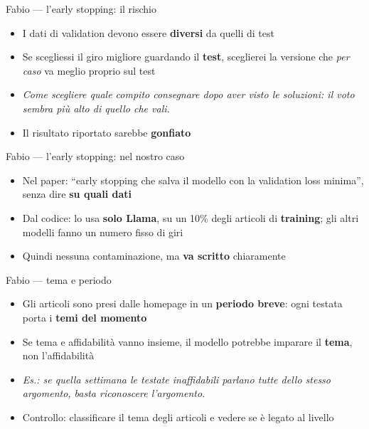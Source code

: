 \documentclass[aspectratio=169]{beamer}
\newcommand{\hl}[1]{\textbf{#1}}
\begin{document}
\begin{frame}{Fabio --- l'early stopping: il rischio}
  \vfill
  \begin{itemize}[<+->]
    \setlength\itemsep{0.8em}
    \item I dati di validation devono essere \hl{diversi} da quelli di test
    \item Se scegliessi il giro migliore guardando il \hl{test}, sceglierei la versione che \emph{per caso} va meglio proprio sul test
    \item[] {\small\itshape Come scegliere quale compito consegnare dopo aver visto le soluzioni: il voto sembra pi\`u alto di quello che vali.}
    \item Il risultato riportato sarebbe \hl{gonfiato}
  \end{itemize}
  \vfill
\end{frame}

\begin{frame}{Fabio --- l'early stopping: nel nostro caso}
  \vfill
  \begin{itemize}[<+->]
    \setlength\itemsep{0.8em}
    \item Nel paper: ``early stopping che salva il modello con la validation loss minima'', senza dire \hl{su quali dati}
    \item Dal codice: lo usa \hl{solo Llama}, su un 10\% degli articoli di \hl{training}; gli altri modelli fanno un numero fisso di giri
    \item Quindi nessuna contaminazione, ma \hl{va scritto} chiaramente
  \end{itemize}
  \vfill
\end{frame}

\begin{frame}{Fabio --- tema e periodo}
  \vfill
  \begin{itemize}[<+->]
    \setlength\itemsep{0.8em}
    \item Gli articoli sono presi dalle homepage in un \hl{periodo breve}: ogni testata porta i \hl{temi del momento}
    \item Se tema e affidabilit\`a vanno insieme, il modello potrebbe imparare il \hl{tema}, non l'affidabilit\`a
    \item[] {\small\itshape Es.: se quella settimana le testate inaffidabili parlano tutte dello stesso argomento, basta riconoscere l'argomento.}
    \item Controllo: classificare il tema degli articoli e vedere se \`e legato al livello
  \end{itemize}
  \vfill
\end{frame}
\end{document}
